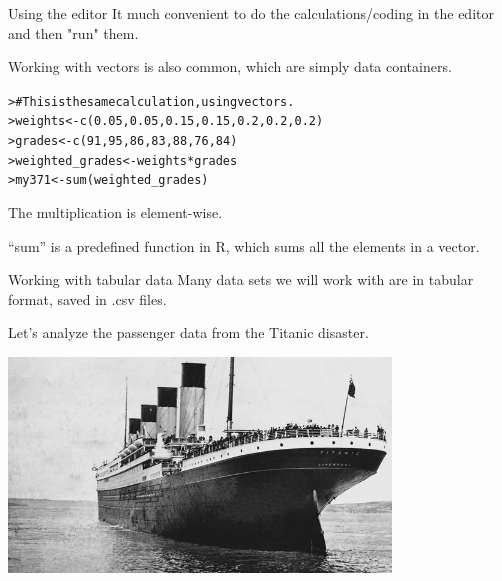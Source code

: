 \documentclass{beamer}\usepackage[]{graphicx}\usepackage[]{color}
\makeatletter
\newcommand{\hlnum}[1]{\textcolor[rgb]{0.824,0.412,0.118}{#1}}%
\newcommand{\hlcom}[1]{\textcolor[rgb]{0.824,0.706,0.549}{#1}}%
\newcommand{\hlopt}[1]{\textcolor[rgb]{1,0.894,0.769}{#1}}%
\newcommand{\hlstd}[1]{\textcolor[rgb]{1,0.894,0.769}{#1}}%
\newcommand{\hlkwb}[1]{\textcolor[rgb]{0.804,0.776,0.451}{#1}}%
\newcommand{\hlkwd}[1]{\textcolor[rgb]{1,0.78,0.769}{#1}}%
\newenvironment{kframe}{%
 \def\at@end@of@kframe{}%
 \ifinner\ifhmode%
  \def\at@end@of@kframe{\end{minipage}}%
  \begin{minipage}{\columnwidth}%
 \fi\fi%
 \def\FrameCommand##1{\hskip\@totalleftmargin \hskip-\fboxsep
 \colorbox{shadecolor}{##1}\hskip-\fboxsep
     \hskip-\linewidth \hskip-\@totalleftmargin \hskip\columnwidth}%
 \MakeFramed {\advance\hsize-\width
   \@totalleftmargin\z@ \linewidth\hsize
   \@setminipage}}%
 {\par\unskip\endMakeFramed%
 \at@end@of@kframe}
\newenvironment{knitrout}{}{} %
\makeatother
\begin{document}
\begin{darkframes}
    \begin{frame}[fragile]{Using the editor}
      \fontsize{10}{10}\selectfont
      It much convenient to do the calculations/coding in the editor and then "run" them. \pause
      
      Working with vectors is also common, which are simply data containers.

\begin{knitrout}
\begin{kframe}
\begin{alltt}
\hlstd{> }  \hlcom{# This is the same calculation, using vectors.}
\hlstd{> }  \hlstd{weights} \hlkwb{<-} \hlkwd{c}\hlstd{(}\hlnum{0.05}\hlstd{,} \hlnum{0.05}\hlstd{,} \hlnum{0.15}\hlstd{,} \hlnum{0.15}\hlstd{,} \hlnum{0.2}\hlstd{,} \hlnum{0.2}\hlstd{,} \hlnum{0.2}\hlstd{)}
\hlstd{> }  \hlstd{grades} \hlkwb{<-} \hlkwd{c}\hlstd{(}\hlnum{91}\hlstd{,} \hlnum{95}\hlstd{,} \hlnum{86}\hlstd{,} \hlnum{83}\hlstd{,} \hlnum{88}\hlstd{,} \hlnum{76}\hlstd{,} \hlnum{84}\hlstd{)}
\hlstd{> }  \hlstd{weighted_grades} \hlkwb{<-} \hlstd{weights}\hlopt{*}\hlstd{grades}
\hlstd{> }  \hlstd{my371} \hlkwb{<-} \hlkwd{sum}\hlstd{(weighted_grades)}
\end{alltt}
\end{kframe}
\end{knitrout}
      The multiplication is element-wise. \pause
      
      ``sum'' is a predefined function in R, which sums all the elements in a vector.
  

    \end{frame}
    
    
    
    \begin{frame}[fragile]{Working with tabular data}
      \fontsize{10}{10}\selectfont
      Many data sets we will work with are in tabular format, saved in .csv files. \pause
      
      Let's analyze the passenger data from the Titanic disaster.
      \begin{center}
        \includegraphics[width=4in]{titanic}
      \end{center} 
    

\end{frame}
\end{darkframes}
\end{document}
